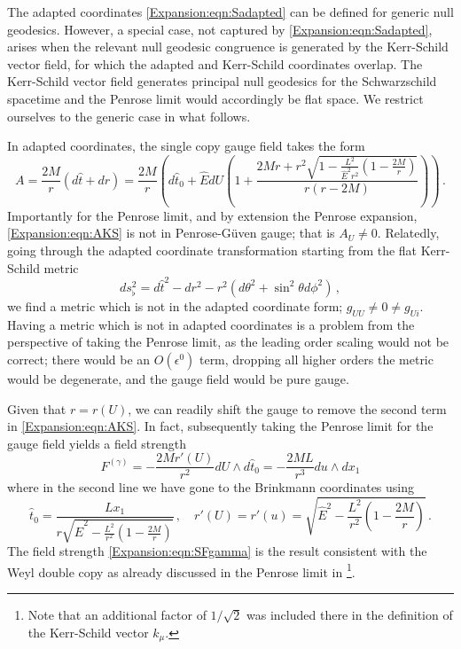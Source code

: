 The adapted coordinates \eqref{Expansion:eqn:Sadapted} can be defined for generic null geodesics. However, a special case, not captured by \eqref{Expansion:eqn:Sadapted}, arises when the relevant null geodesic congruence is  generated by the Kerr-Schild vector field, for which the adapted and Kerr-Schild coordinates overlap. The Kerr-Schild vector field generates principal null geodesics for the Schwarzschild spacetime and the Penrose limit would accordingly be flat space. We restrict ourselves to the generic case in what follows.

In adapted coordinates, the single copy gauge field takes the form
\begin{equation}\label{Expansion:eqn:AKS}
A = \frac{2M}{r}(d\hat{t} + dr) = \frac{2M}{r}\left(d\hat{t}_0 + \hat{E} dU \left(1+\frac{2 M r + r^2\sqrt{1-\frac{L^2}{\hat{E}^2 r^2}(1-\frac{2M}{r})}}{r(r-2M)}\right) \right) \, .
\end{equation}
Importantly for the Penrose limit, and by extension the Penrose expansion, \eqref{Expansion:eqn:AKS} is not in Penrose-G\"uven gauge; that is $A_U \neq 0$. Relatedly, going through the adapted coordinate transformation starting from the flat Kerr-Schild metric
\begin{equation}\label{Expansion:eqn:SmetricKSflat}
ds^2_{\flat} = d\hat{t}^2- dr^2-r^2 \left(d\theta^2 + \sin^2\theta d \phi^2\right)  \, ,
\end{equation} 
we find a metric which is not in the adapted coordinate form; $g_{UU} \neq 0 \neq g_{Ui}$. Having a metric which is not in adapted coordinates is a problem from the perspective of taking the Penrose limit, as the leading order scaling would not be correct; there would be an $O(\epsilon^0)$ term, dropping all higher orders the metric would be degenerate, and the gauge field would be pure gauge. 

Given that $r=r(U)$, we can readily shift the gauge to remove the second term in \eqref{Expansion:eqn:AKS}. In fact, subsequently taking the Penrose limit for the gauge field yields a field strength
\begin{equation}\label{Expansion:eqn:SFgamma}
F^{(\gamma)} = -\frac{2M r'(U)}{r^2} dU \wedge d\hat{t}_0 = - \frac{2M L}{r^3} du \wedge dx_1 
\end{equation}
where in the second line we have gone to the Brinkmann coordinates using
\begin{equation}
\hat{t}_0= \frac{L x_1}{r \sqrt{ \hat{E}^2-\frac{L^2}{r^2}(1-\frac{2M}{r})}} \, , \quad r'(U) = r'(u) =  \sqrt{\hat{E}^2-\frac{L^2}{r^2}(1-\frac{2M}{r})} \, .
\end{equation}
The field strength \eqref{Expansion:eqn:SFgamma} is the result consistent with the Weyl double copy as already discussed in the Penrose limit in \cite{Chawla:2024mse} \footnote{Note that an additional factor of $1/\sqrt{2}$ was included there in the definition of the Kerr-Schild vector $k_{\mu}$.}.

